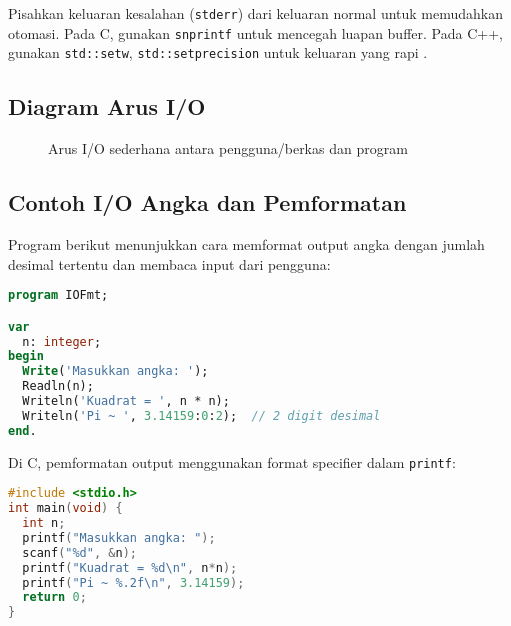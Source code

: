 \documentclass[../main.tex]{subfiles}
\begin{document}
Pisahkan keluaran kesalahan (\texttt{stderr}) dari keluaran normal untuk memudahkan otomasi. Pada C, gunakan \texttt{snprintf} untuk mencegah luapan buffer. Pada C++, gunakan \texttt{std::setw}, \texttt{std::setprecision} untuk keluaran yang rapi \parencite{gnu-c-manual,cpp-reference,cpp-iomanip}.

\subsection{Diagram Arus I/O}
\begin{figure}[H]
  \centering
  \caption{Arus I/O sederhana antara pengguna/berkas dan program}
  \label{fig:io-flow}
\end{figure}

\subsection{Contoh I/O Angka dan Pemformatan}

Program berikut menunjukkan cara memformat output angka dengan jumlah desimal tertentu dan membaca input dari pengguna:

\begin{lstlisting}[language=Pascal, caption={Baca integer dan format keluaran (Pascal)}]
program IOFmt;

var
  n: integer;
begin
  Write('Masukkan angka: ');
  Readln(n);
  Writeln('Kuadrat = ', n * n);
  Writeln('Pi ~ ', 3.14159:0:2);  // 2 digit desimal
end.
\end{lstlisting}

Di C, pemformatan output menggunakan format specifier dalam \texttt{printf}:

\begin{lstlisting}[language=C, caption={Baca integer dan format keluaran (C)}]
#include <stdio.h>
int main(void) {
  int n;
  printf("Masukkan angka: ");
  scanf("%d", &n);
  printf("Kuadrat = %d\n", n*n);
  printf("Pi ~ %.2f\n", 3.14159);
  return 0;
}
\end{lstlisting}
\end{document}
